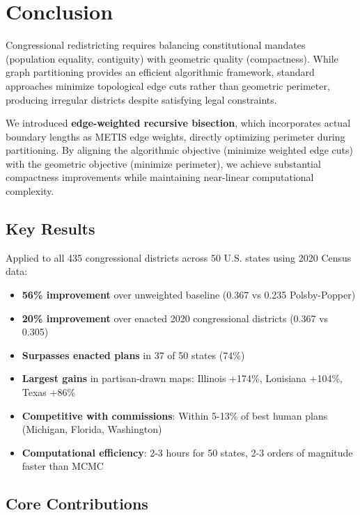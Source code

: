 \section{Conclusion}

Congressional redistricting requires balancing constitutional mandates (population equality, contiguity) with geometric quality (compactness). While graph partitioning provides an efficient algorithmic framework, standard approaches minimize topological edge cuts rather than geometric perimeter, producing irregular districts despite satisfying legal constraints.

We introduced \textbf{edge-weighted recursive bisection}, which incorporates actual boundary lengths as METIS edge weights, directly optimizing perimeter during partitioning. By aligning the algorithmic objective (minimize weighted edge cuts) with the geometric objective (minimize perimeter), we achieve substantial compactness improvements while maintaining near-linear computational complexity.

\subsection{Key Results}

Applied to all 435 congressional districts across 50 U.S. states using 2020 Census data:

\begin{itemize}
    \item \textbf{56\% improvement} over unweighted baseline (0.367 vs 0.235 Polsby-Popper)
    \item \textbf{20\% improvement} over enacted 2020 congressional districts (0.367 vs 0.305)
    \item \textbf{Surpasses enacted plans} in 37 of 50 states (74\%)
    \item \textbf{Largest gains} in partisan-drawn maps: Illinois +174\%, Louisiana +104\%, Texas +86\%
    \item \textbf{Competitive with commissions}: Within 5-13\% of best human plans (Michigan, Florida, Washington)
    \item \textbf{Computational efficiency}: 2-3 hours for 50 states, 2-3 orders of magnitude faster than MCMC
\end{itemize}

\subsection{Core Contributions}

